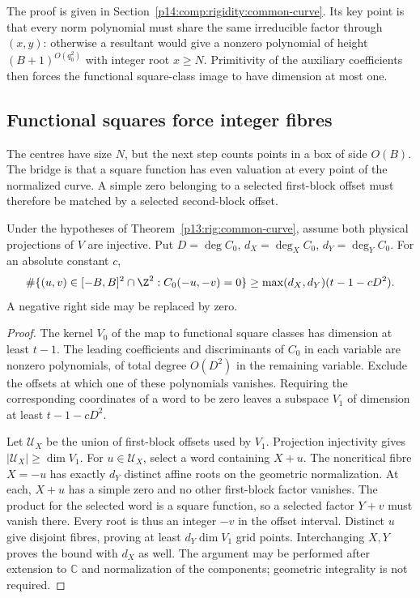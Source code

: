 The proof is given in Section~\ref{p14:comp:rigidity:common-curve}.
Its key point is that every norm polynomial must share the same
irreducible factor through $(x,y)$: otherwise a resultant would give
a nonzero polynomial of height $(B+1)^{O(q_0^2)}$ with integer root
$x\ge N$.  Primitivity of the auxiliary coefficients then forces the
functional square-class image to have dimension at most one.

\subsection{Functional squares force integer fibres}

The centres have size $N$, but the next step counts points
in a box of side $O(B)$.  The bridge is that a square
function has even valuation at every point of the normalized
curve.  A simple zero belonging to a selected first-block
offset must therefore be matched by a selected second-block
offset.

\begin{proposition}
\label{p13:rig:grid-fibres}
Under the hypotheses of Theorem~\ref{p13:rig:common-curve},
assume both physical projections of $V$ are injective.
Put $D=\deg C_0$, $d_X=\deg_XC_0$, $d_Y=\deg_YC_0$.
For an absolute constant $c$,
\begin{equation}
 \#\{(u,v)\in[-B,B]^2\cap\Z^2:C_0(-u,-v)=0\}
       \ge\max(d_X,d_Y)(t-1-cD^2).
 \label{p13:rig:grid-count}
\end{equation}
A negative right side may be replaced by zero.
\end{proposition}

\begin{proof}
The kernel $V_0$ of the map to functional square classes
has dimension at least $t-1$.  The leading coefficients
and discriminants of $C_0$ in each variable are nonzero
polynomials, of total degree $O(D^2)$ in the remaining
variable.  Exclude the offsets at which one of these
polynomials vanishes.  Requiring the corresponding
coordinates of a word to be zero leaves a subspace $V_1$
of dimension at least $t-1-cD^2$.

Let $\mathcal U_X$ be the union of first-block offsets used
by $V_1$.  Projection injectivity gives
$|\mathcal U_X|\ge\dim V_1$.
For $u\in\mathcal U_X$, select a word containing $X+u$.
The noncritical fibre $X=-u$ has exactly $d_Y$ distinct
affine roots on the geometric normalization.  At each,
$X+u$ has a simple zero and no other first-block factor
vanishes.  The product for the selected word is a square
function, so a selected factor $Y+v$ must vanish there.
Every root is thus an integer $-v$ in the offset interval.
Distinct $u$ give disjoint fibres, proving at least
$d_Y\dim V_1$ grid points.  Interchanging $X,Y$ proves
the bound with $d_X$ as well.
The argument may be performed after extension to
$\mathbb C$ and normalization of the components; geometric
integrality is not required.
\end{proof}

